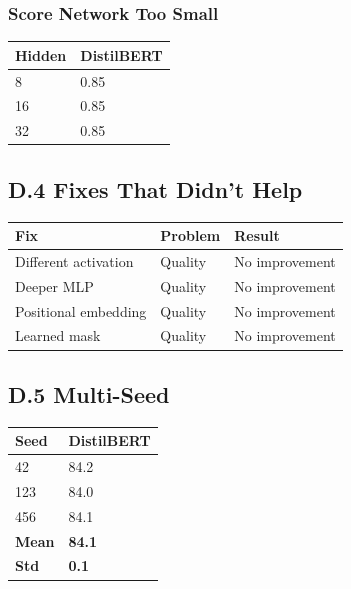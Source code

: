 {\subsubsection{Score Network Too Small}
\begin{table}[H]
\centering
\small
\begin{tabular}{ll}
\toprule
\textbf{Hidden} & \textbf{DistilBERT} \\
\midrule
8 & 0.85 \\
16 & 0.85 \\
32 & 0.85 \\
\bottomrule
\end{tabular}
\end{table}

\subsection{D.4 Fixes That Didn't Help}

\begin{table}[H]
\centering
\small
\begin{tabular}{lll}
\toprule
\textbf{Fix} & \textbf{Problem} & \textbf{Result} \\
\midrule
Different activation & Quality & No improvement \\
Deeper MLP & Quality & No improvement \\
Positional embedding & Quality & No improvement \\
Learned mask & Quality & No improvement \\
\bottomrule
\end{tabular}
\end{table}

\subsection{D.5 Multi-Seed}

\begin{table}[H]
\centering
\small
\begin{tabular}{ll}
\toprule
\textbf{Seed} & \textbf{DistilBERT} \\
\midrule
42 & 84.2 \\
123 & 84.0 \\
456 & 84.1 \\
\textbf{Mean} & \textbf{84.1} \\
\textbf{Std} & \textbf{0.1} \\
\bottomrule
\end{tabular}
\end{table}

}
